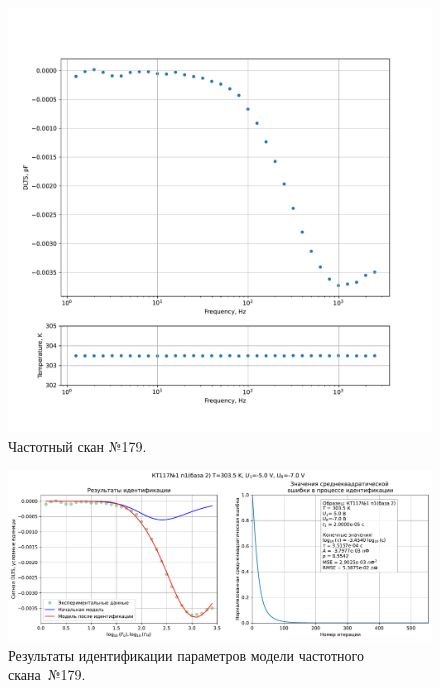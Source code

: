 \begin{figure}[!ht]
    \centering
    \includegraphics[width=1\textwidth]{../plots/КТ117№1_п1(база 2)_2500Гц-1Гц_1пФ_+30С_-5В-7В_50мВ_20мкс_шаг_0,1.pdf}
    \caption{Частотный скан №179.}
    \label{pic:frequency_scan_179}
\end{figure}

\begin{figure}[!ht]
    \centering
    \includegraphics[width=1\textwidth]{../plots/КТ117№1_п1(база 2)_2500Гц-1Гц_1пФ_+30С_-5В-7В_50мВ_20мкс_шаг_0,1_model.pdf}
    \caption{Результаты идентификации параметров модели частотного скана~№179.}
    \label{pic:frequency_scan_model179}
\end{figure}

\pagebreak


